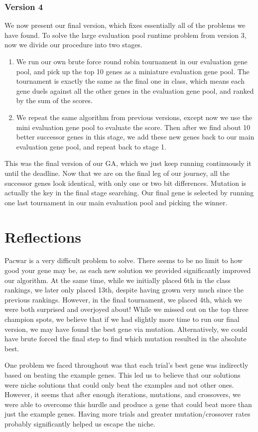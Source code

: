 \documentclass[twoside]{article}
\begin{document}
\begin{multicols}{2}
\subsubsection{Version 4}
We now present our final version, which fixes essentially all of the problems we have found. To solve the large evaluation pool runtime problem from version 3, now we divide our procedure into two stages.
\begin{enumerate}
\item We run our own brute force round robin tournament in our evaluation gene pool, and pick up the top 10 genes as a miniature evaluation gene pool. The tournament is exactly the same as the final one in class, which means each gene duels against all the other genes in the evaluation gene pool, and ranked by the sum of the scores.
\item We repeat the same algorithm from previous versions, except now we use the mini evaluation gene pool to evaluate the score. Then after we find about 10 better successor genes in this stage, we add these new genes back to our main evaluation gene pool, and repeat back to stage 1.
\end{enumerate}
This was the final version of our GA, which we just keep running continuously it until the deadline. Now that we are on the final leg of our journey, all the successor genes look identical, with only one or two bit differences. Mutation is actually the key in the final stage searching. Our final gene is selected by running one last tournament in our main evaluation pool and picking the winner.


\section{Reflections}
Pacwar is a very difficult problem to solve. There seems to be no limit to how good your gene may be, as each new solution we provided significantly improved our algorithm. At the same time, while we initially placed 6th in the class rankings, we later only placed 13th, despite having grown very much since the previous rankings. However, in the final tournament, we placed 4th, which we were both surprised and overjoyed about! While we missed out on the top three champion spots, we believe that if we had slightly more time to run our final version, we may have found the best gene via mutation. Alternatively, we could have brute forced the final step to find which mutation resulted in the absolute best.

One problem we faced throughout was that each trial's best gene was indirectly based on beating the example genes. This led us to believe that our solutions were niche solutions that could only beat the examples and not other ones. However, it seems that after enough iterations, mutations, and crossovers, we were able to overcome this hurdle and produce a gene that could beat more than just the example genes. Having more trials and greater mutation/crossover rates probably significantly helped us escape the niche. 


\end{multicols}
\end{document}
